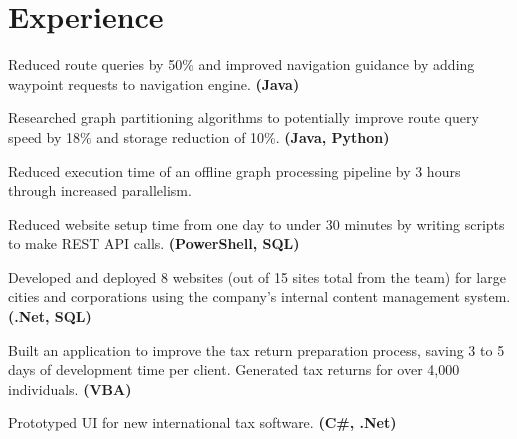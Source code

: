 \documentclass[letterpaper]{kevin-resume} %
\begin{document}
\begin{minipage}[t]{0.63\textwidth} %


\section{Experience}

\vspace{\topsep} %
\begin{tightitemize}
	\item Reduced route queries by 50\% and improved navigation guidance by adding waypoint requests to navigation engine. \textbf{(Java)}
	\item Researched graph partitioning algorithms to potentially improve route query speed by 18\% and storage reduction of 10\%. \textbf{(Java, Python)}
	\item Reduced execution time of an offline graph processing pipeline by 3 hours through increased parallelism.
\end{tightitemize}

\sectionspace %

\begin{tightitemize}
	\item Reduced website setup time from one day to under 30 minutes by writing scripts to make REST API calls. \textbf{(PowerShell, SQL)}
	\item Developed and deployed 8 websites (out of 15 sites total from the team) for large cities and corporations using the company's internal content management system. \textbf{(.Net, SQL)}
\end{tightitemize}

\sectionspace %


\begin{tightitemize}
	\item Built an application to improve the tax return preparation process, saving 3 to 5 days of development time per client. Generated tax returns for over 4,000 individuals. \textbf{(VBA)}
	\item Prototyped UI for new international tax software. \textbf{(C\#, .Net)}
\end{tightitemize}


\end{minipage}
\end{document}
